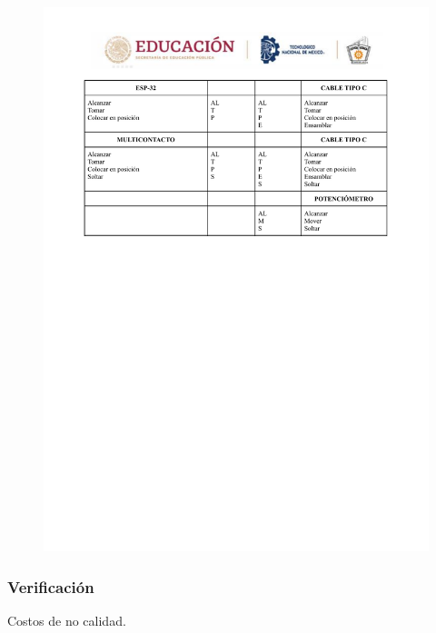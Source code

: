    \begin{figure}
        \centering
        \includegraphics[trim = {5mm 15mm 5mm 10mm},clip,scale=0.3]{24/Img/diagramaBimanual4.pdf}
        \caption{}
        \label{fig:Diagrama Bimanual4}
    \end{figure}
    \subsubsection{Verificación}
    
    
    Costos de no calidad.
